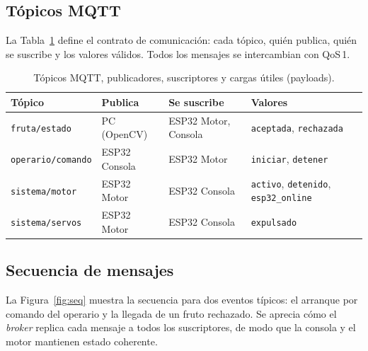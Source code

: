 \documentclass[12pt]{catolica_proyectos}
\begin{document}
\subsection{Tópicos MQTT}
La Tabla~\ref{tab:topics} define el contrato de comunicación: cada tópico, quién publica, quién se suscribe y los valores válidos. Todos los mensajes se intercambian con QoS\,1.

\begin{table}[H]
\centering
\caption{Tópicos MQTT, publicadores, suscriptores y cargas útiles (payloads).}
\label{tab:topics}
\footnotesize
\begin{tabular}{@{}llll@{}}
\toprule
\textbf{Tópico} & \textbf{Publica} & \textbf{Se suscribe} & \textbf{Valores} \\
\midrule
\texttt{fruta/estado} & PC (OpenCV) & ESP32 Motor, Consola & \texttt{aceptada}, \texttt{rechazada} \\
\texttt{operario/comando} & ESP32 Consola & ESP32 Motor & \texttt{iniciar}, \texttt{detener} \\
\texttt{sistema/motor} & ESP32 Motor & ESP32 Consola & \texttt{activo}, \texttt{detenido}, \texttt{esp32\_online} \\
\texttt{sistema/servos} & ESP32 Motor & ESP32 Consola & \texttt{expulsado} \\
\bottomrule
\end{tabular}
\end{table}

\subsection{Secuencia de mensajes}
La Figura~\ref{fig:seq} muestra la secuencia para dos eventos típicos: el arranque por comando del operario y la llegada de un fruto rechazado. Se aprecia cómo el \emph{broker} replica cada mensaje a todos los suscriptores, de modo que la consola y el motor mantienen estado coherente.
\end{document}
